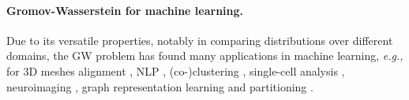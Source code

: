 \paragraph{Gromov-Wasserstein for machine learning.}
Due to its versatile properties, notably in comparing distributions over different domains,  the GW problem has found many applications in machine learning, \textit{e.g.,} for 3D meshes alignment \citep{solomon2016entropic,ezuz2017gwcnn}, NLP \citep{alvarez2018gromov}, (co-)clustering  \citep{peyre2016gromov, redko2020co}, single-cell analysis \citep{demetci2020gromov}, neuroimaging \citep{thual2022aligning}, graph representation learning \citep{xu2020gromov, vincent2021online, liu2022robust, vincent2022template, pmlr-v202-zeng23c} and partitioning \citep{xu2019scalable, chowdhury2021generalized}.
